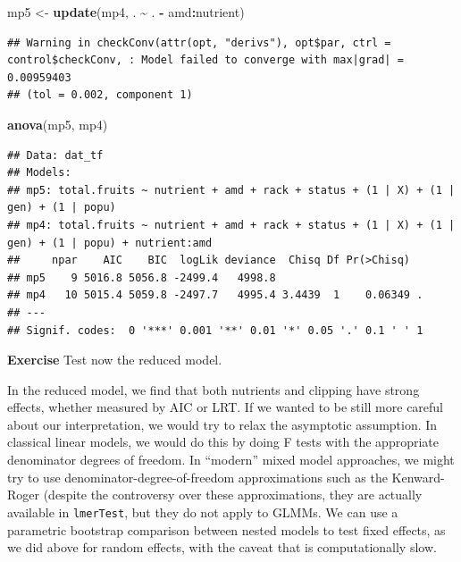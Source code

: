 \documentclass[
  12pt,
]{book}
\newenvironment{Shaded}{\begin{snugshade}}{\end{snugshade}}
\newcommand{\KeywordTok}[1]{\textcolor[rgb]{0.13,0.29,0.53}{\textbf{#1}}}
\newcommand{\NormalTok}[1]{#1}
\newcommand{\OperatorTok}[1]{\textcolor[rgb]{0.81,0.36,0.00}{\textbf{#1}}}
\newcommand{\StringTok}[1]{\textcolor[rgb]{0.31,0.60,0.02}{#1}}
\begin{document}
\begin{Shaded}
\begin{Highlighting}[]
\NormalTok{mp5 \textless{}{-}}\StringTok{ }\KeywordTok{update}\NormalTok{(mp4, . }\OperatorTok{\textasciitilde{}}\StringTok{ }\NormalTok{. }\OperatorTok{{-}}\StringTok{ }\NormalTok{amd}\OperatorTok{:}\NormalTok{nutrient)}
\end{Highlighting}
\end{Shaded}

\begin{verbatim}
## Warning in checkConv(attr(opt, "derivs"), opt$par, ctrl = control$checkConv, : Model failed to converge with max|grad| = 0.00959403
## (tol = 0.002, component 1)
\end{verbatim}

\begin{Shaded}
\begin{Highlighting}[]
\KeywordTok{anova}\NormalTok{(mp5, mp4)}
\end{Highlighting}
\end{Shaded}

\begin{verbatim}
## Data: dat_tf
## Models:
## mp5: total.fruits ~ nutrient + amd + rack + status + (1 | X) + (1 | gen) + (1 | popu)
## mp4: total.fruits ~ nutrient + amd + rack + status + (1 | X) + (1 | gen) + (1 | popu) + nutrient:amd
##     npar    AIC    BIC  logLik deviance  Chisq Df Pr(>Chisq)  
## mp5    9 5016.8 5056.8 -2499.4   4998.8                       
## mp4   10 5015.4 5059.8 -2497.7   4995.4 3.4439  1    0.06349 .
## ---
## Signif. codes:  0 '***' 0.001 '**' 0.01 '*' 0.05 '.' 0.1 ' ' 1
\end{verbatim}

\textbf{Exercise}
Test now the reduced model.

In the reduced model, we find that both nutrients and clipping have strong effects, whether measured by AIC or LRT. If we wanted to be still more careful about our interpretation, we would try to relax the asymptotic assumption. In classical linear models, we would do this by doing F tests with the appropriate denominator degrees of freedom. In ``modern'' mixed model approaches, we might try to use denominator-degree-of-freedom approximations such as the Kenward-Roger (despite the controversy over these approximations, they are actually available in \texttt{lmerTest}, but they do not apply to GLMMs. We can use a parametric bootstrap comparison between nested models to test fixed effects, as we did above for random effects, with the caveat that is computationally slow.
\end{document}
